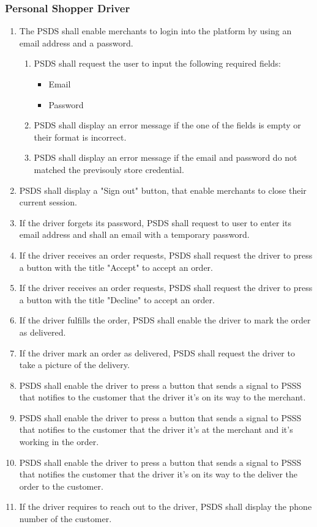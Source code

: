 \pagebreak

\subsubsection{Personal Shopper Driver}
\begin{enumerate}[resume, label=SY-\arabic*]
    \item  The PSDS shall enable merchants to login into the platform by 
    using an email address and a password.
    \begin{enumerate}[label=SY-28.\arabic*]
        \item PSDS shall request the user to input the following required 
        fields:
        \begin{itemize}
            \item Email
            \item Password
        \end{itemize}
        \item PSDS shall display an error message if the one of the fields is 
        empty or their format is incorrect.
        \item PSDS shall display an error message if the email and password 
        do not matched the previsouly store credential.
    \end{enumerate}
    \item PSDS shall display a "Sign out" button, that enable merchants to 
    close their current session.
    \item  If the driver forgets its password, PSDS shall request to user to 
    enter its email address and shall an email with a temporary password.
    \item  If the driver receives an order requests, PSDS shall request the 
    driver to press a button with the title "Accept" to accept an order.
    \item  If the driver receives an order requests, PSDS shall request the 
    driver to press a button with the title "Decline" to accept an order.
    \item  If the driver fulfills the order, PSDS shall enable the driver to 
    mark the order as delivered.
	\item  If the driver mark an order as delivered, PSDS shall request the 
    driver to take a picture of the delivery.
    \item  PSDS shall enable the driver to press a button that sends a signal 
    to PSSS that notifies to the customer that the driver it's on its 
    way to the merchant.
    \item  PSDS shall enable the driver to press a button that sends a signal 
    to PSSS that notifies to the customer that the driver it's at the 
    merchant and it's working in the order.
    \item  PSDS shall enable the driver to press a button that sends a signal 
    to PSSS that notifies the customer that the driver it's on its way to the 
    deliver the order to the customer.
    \item  If the driver requires to reach out to the driver, PSDS shall 
    display the phone number of the customer.
\end{enumerate}
